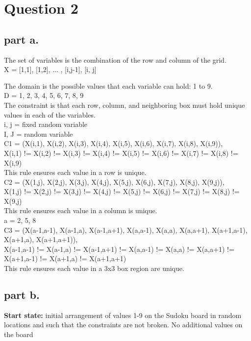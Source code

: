 \section{Question 2}

\subsection{part a.}
The set of variables is the combination of the row and column of the grid. \\
X = {[1,1], [1,2], ... , [i,j-1], [i, j]}

The domain is the possible values that each variable can hold: 1 to 9.\\
D = {1, 2, 3, 4, 5, 6, 7, 8, 9} \\

The constraint is that each row, column, and neighboring box must hold unique values in each of the variables. \\
 
i, j = fixed random variable \\
I, J = random variable \\
C1 = {(X(i,1), X(i,2), X(i,3), X(i,4), X(i,5), X(i,6), X(i,7), X(i,8), X(i,9)),\\
	{X(i,1) != X(i,2) != X(i,3) != X(i,4) != X(i,5) != X(i,6) != X(i,7) != X(i,8) != X(i,9)}}\\
This rule ensures each value in a row is unique. \\

C2 = {(X(1,j), X(2,j), X(3,j), X(4,j), X(5,j), X(6,j), X(7,j), X(8,j), X(9,j)), \\
{X(1,j) != X(2,j) != X(3,j) != X(4,j) != X(5,j) != X(6,j) != X(7,j) != X(8,j) != X(9,j)}}\\
This rule ensures each value in a column is unique. \\

a = 2, 5, 8 \\
C3 = {(X(a-1,a-1), X(a-1,a), X(a-1,a+1), X(a,a-1), X(a,a), X(a,a+1), X(a+1,a-1), X(a+1,a), X(a+1,a+1)), \\
	{X(a-1,a-1) != X(a-1,a) != X(a-1,a+1) != X(a,a-1) != X(a,a) != X(a,a+1) != X(a+1,a-1) != X(a+1,a) != X(a+1,a+1)}}\\
This rule ensures each value in a 3x3 box region are unique.

\subsection{part b.}
\textbf{Start state:} initial arrangement of values 1-9 on the Sudoku board in random locations and such that the constraints are not broken. No additional values on the board\\

